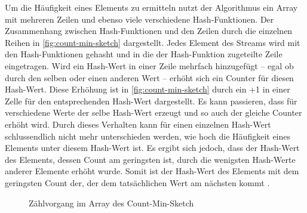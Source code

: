 Um die Häufigkeit eines Elements zu ermitteln 
nutzt der Algorithmus ein Array mit mehreren Zeilen 
und ebenso viele verschiedene Hash-Funktionen.
Der Zusammenhang zwischen Hash-Funktionen und den Zeilen durch die einzelnen Reihen in \autoref{fig:count-min-sketch} dargestellt. 
Jedes Element des Streams wird mit den Hash-Funktionen gehasht 
und in die der Hash-Funktion zugeteilte Zeile eingetragen. 
Wird ein Hash-Wert in einer Zeile mehrfach hinzugefügt -- egal ob durch den selben oder einen anderen Wert -- 
erhöht sich ein Counter für diesen Hash-Wert. 
Diese Erhöhung ist in \autoref{fig:count-min-sketch} durch ein +1 in einer Zelle für den entsprechenden Hash-Wert dargestellt.
Es kann passieren, dass für verschiedene Werte der selbe Hash-Wert erzeugt 
und so auch der gleiche Counter erhöht wird.
Durch dieses Verhalten kann für einen einzelnen Hash-Wert 
schlussendlich nicht mehr unterschieden werden, 
wie hoch die Häufigkeit eines Elements unter diesem Hash-Wert ist. 
Es ergibt sich jedoch, dass der Hash-Wert des Elements, dessen Count am geringsten ist, 
durch die wenigsten Hash-Werte anderer Elemente erhöht wurde. 
Somit ist der Hash-Wert des Elements mit dem geringsten Count der, 
der dem tatsächlichen Wert am nächsten kommt \cite{cormode2017}.

\begin{figure}
	\centering
	\caption{Zählvorgang im Array des Count-Min-Sketch}
	\label{fig:count-min-sketch}
\end{figure}

